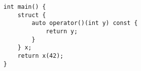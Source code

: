 \begin{lstlisting}[title=\href{https://godbolt.org/z/xfcYM7}{\texttt{godbolt.org/z/xfcYM7}}]
int main() {
    struct {
        auto operator()(int y) const {
            return y;
        }
    } x;
    return x(42);
}
\end{lstlisting}
